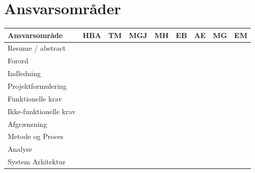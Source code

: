 \documentclass[a4paper,12pt,fleqn,oneside]{article}
\begin{document}
\section{Ansvarsområder}
\begin{longtable}{|L{0.2\textwidth}|L{0.082\textwidth}|L{0.08\textwidth}|L{0.08\textwidth}|L{0.08\textwidth}|L{0.08\textwidth}|L{0.08\textwidth}|L{0.08\textwidth}|L{0.08\textwidth}|}
        \hline
        \textbf{Ansvarsområde}  &\textbf{HBA}   &\textbf{TM}    &\textbf{MGJ}   &\textbf{MH}    &\textbf{EB}    & \textbf{AE}  & \textbf{MG}   &\textbf{EM}      \\ \hline
        Resume / abstract       &               &               &               &               &               &               &               &                \\ \hline
        Forord                  &               &               &               &               &               &               &               &                \\ \hline
        Indledning              &               &               &               &               &               &               &               &                \\ \hline
        Projektformulering      &               &               &               &               &               &               &               &                \\ \hline
        Funktionelle krav       &               &               &               &               &               &               &               &                \\ \hline
        Ikke-funktionelle krav  &               &               &               &               &               &               &               &                \\ \hline
        Afgrænsning             &               &               &               &               &               &               &               &                \\ \hline
        Metode og Proces        &               &               &               &               &               &               &               &                \\ \hline
        Analyse                 &               &               &               &               &               &               &               &                \\ \hline   
        System Arkitektur       &               &               &               &               &               &               &               &                \\ \hline

\end{longtable}
\end{document}
